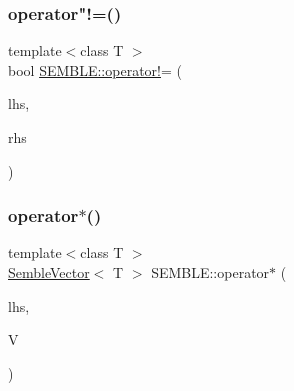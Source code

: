 \mbox{\label{namespaceSEMBLE_a38cb07db0e226da61bdec6cba6723080}} 
\subsubsection{\texorpdfstring{operator"!=()}{operator!=()}\hspace{0.1cm}{\footnotesize\ttfamily [2/2]}}
{\footnotesize\ttfamily template$<$class T $>$ \\
bool \mbox{\hyperlink{install_2include_2fitting__lib_2data__selectors_8h_ac9b7fb56cc4a383e271994460eef1a48}{S\+E\+M\+B\+L\+E\+::operator!}}= (\begin{DoxyParamCaption}\item[{const \mbox{\hyperlink{structSEMBLE_1_1SembleMatrix}{Semble\+Matrix}}$<$ T $>$ \&}]{lhs,  }\item[{const \mbox{\hyperlink{structSEMBLE_1_1SembleMatrix}{Semble\+Matrix}}$<$ T $>$ \&}]{rhs }\end{DoxyParamCaption})}

\mbox{\label{namespaceSEMBLE_aa71efe4d36f073316935eb894fa8f60e}} 
\subsubsection{\texorpdfstring{operator$\ast$()}{operator*()}\hspace{0.1cm}{\footnotesize\ttfamily [1/20]}}
{\footnotesize\ttfamily template$<$class T $>$ \\
\mbox{\hyperlink{structSEMBLE_1_1SembleVector}{Semble\+Vector}}$<$ T $>$ S\+E\+M\+B\+L\+E\+::operator$\ast$ (\begin{DoxyParamCaption}\item[{const T \&}]{lhs,  }\item[{const \mbox{\hyperlink{structSEMBLE_1_1SembleVector}{Semble\+Vector}}$<$ T $>$ \&}]{V }\end{DoxyParamCaption})}

\mbox{\label{namespaceSEMBLE_a80661aa291e6013de69fcc09abfffe9d}} 
